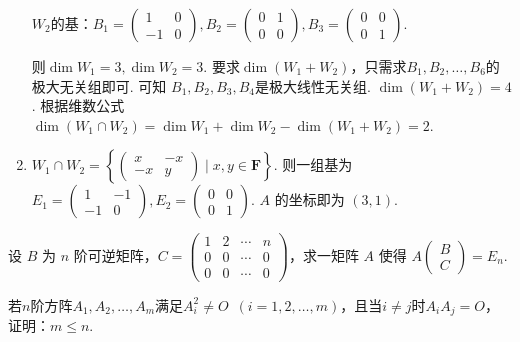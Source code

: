 \begin{exercise}
\begin{exgroup}
\begin{answer}
\begin{enumerate}
                    $W_2$的基：$B_1=\begin{pmatrix}1&0\\-1&0\end{pmatrix},B_2=\begin{pmatrix}0&1\\0&0\end{pmatrix},B_3=\begin{pmatrix}0&0\\0&1\end{pmatrix}$.

                    则$\dim W_1=3,\dim W_2=3$. 要求$\dim  (W_1+W_2)$，只需求$B_1,B_2,\ldots ,B_6$的极大无关组即可. 可知 $B_1,B_2,B_3,B_4$是极大线性无关组.	$\dim(W_1+W_2)=4$. 根据维数公式$\dim (W_1\cap W_2)=\dim W_1+\dim W_2-\dim (W_1+W_2)=2$.

                \item $W_1\cap W_2=\left\{\begin{pmatrix}x&-x\\-x&y\end{pmatrix} \mid x,y\in \mathbf{F}\right\}$. 则一组基为$E_1=\begin{pmatrix}1&-1\\-1&0\end{pmatrix},E_2=\begin{pmatrix}0&0\\0&1\end{pmatrix}$. $A$ 的坐标即为 $(3,1)$.
            \end{enumerate}
        \end{answer}

        \item 设 $B$ 为 $n$ 阶可逆矩阵，$C = \begin{pmatrix}
            1 & 2 & \cdots & n \\
            0 & 0 & \cdots & 0 \\
            0 & 0 & \cdots & 0
        \end{pmatrix}$，求一矩阵 $A$ 使得 $A\begin{pmatrix}
            B \\ C
        \end{pmatrix} = E_n$.
        \begin{answer}

        \end{answer}
    \end{exgroup}

    \begin{exgroup}
        \item 若$n$阶方阵$A_1,A_2,\ldots,A_m$满足$A_i^2\neq O\enspace(i=1,2,\ldots,m)$，且当$i\neq j$时$A_iA_j=O$，证明：$m \leqslant n$.
        \begin{answer}


\end{answer}
\end{exgroup}
\end{exercise}
